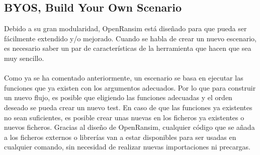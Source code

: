 \documentclass[a4paper,12pt]{article}
\begin{document}
\subsection{BYOS, Build Your Own Scenario}
Debido a su gran modularidad, OpenRansim está diseñado para que pueda ser fácilmente extendido y/o mejorado. Cuando se habla de crear un nuevo escenario, es necesario saber un par de características de la herramienta que hacen que sea muy sencillo.\\\\
Como ya se ha comentado anteriormente, un escenario se basa en ejecutar las funciones que ya existen con los argumentos adecuados. Por lo que para construir un nuevo flujo, es posible que eligiendo las funciones adecuadas y el orden deseado se pueda crear un nuevo test. En caso de que las funciones ya existentes no sean suficientes, es posible crear unas nuevas en los ficheros ya existentes o nuevos ficheros. Gracias al diseño de OpenRansim, cualquier código que se añada a los ficheros externos o librerías van a estar disponibles para ser usadas en cualquier comando, sin necesidad de realizar nuevas importaciones ni precargas.
\newpage
\end{document}
